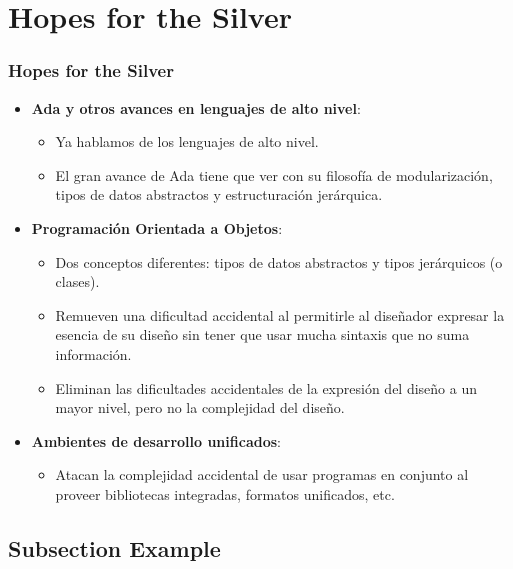\documentclass{beamer}
\begin{document}
\section{Hopes for the Silver}
\begin{frame}
\frametitle{Hopes for the Silver}
\begin{itemize}
	\item \textbf{Ada y otros avances en lenguajes de alto nivel}:
			\begin{itemize}
				\item Ya hablamos de los lenguajes de alto nivel.
				\item El gran avance de Ada tiene que ver con su filosofía de modularización, tipos de datos abstractos y estructuración jerárquica. 
			\end{itemize}
	\item \textbf{Programación Orientada a Objetos}:
			\begin{itemize}
				\item Dos conceptos diferentes: tipos de datos abstractos y tipos jerárquicos (o clases).
				\item Remueven una dificultad accidental al permitirle al diseñador expresar la esencia de su diseño sin tener que usar mucha sintaxis que no suma información.
				\item Eliminan las dificultades accidentales de la expresión del diseño a un mayor nivel, pero no la complejidad del diseño.
			\end{itemize}
	\item \textbf{Ambientes de desarrollo unificados}:
			\begin{itemize}
				\item Atacan la complejidad accidental de usar programas en conjunto al proveer bibliotecas integradas, formatos unificados, etc.
			\end{itemize}
	  
\end{itemize}

\end{frame}



\subsection{Subsection Example} %
\end{document}

